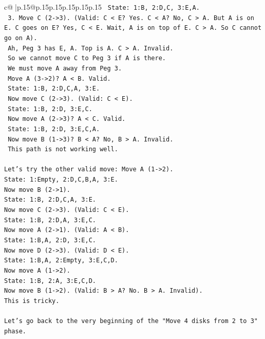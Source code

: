 \documentclass{article}
\begin{document}
{\begin{supertabular}{c@{$\;$}|p{.15\linewidth}@{}p{.15\linewidth}p{.15\linewidth}p{.15\linewidth}p{.15\linewidth}p{.15\linewidth}}
{{{\texttt{      State: 1:B, 2:D,C, 3:E,A.} \\
\texttt{   3. Move C (2{-}>3). (Valid: C < E? Yes. C < A? No, C > A. But A is on E. C goes on E? Yes, C < E. Wait, A is on top of E. C > A. So C cannot go on A).} \\
\texttt{      Ah, Peg 3 has E, A. Top is A. C > A. Invalid.} \\
\texttt{      So we cannot move C to Peg 3 if A is there.} \\
\texttt{      We must move A away from Peg 3.} \\
\texttt{      Move A (3{-}>2)? A < B. Valid.} \\
\texttt{      State: 1:B, 2:D,C,A, 3:E.} \\
\texttt{      Now move C (2{-}>3). (Valid: C < E).} \\
\texttt{      State: 1:B, 2:D, 3:E,C.} \\
\texttt{      Now move A (2{-}>3)? A < C. Valid.} \\
\texttt{      State: 1:B, 2:D, 3:E,C,A.} \\
\texttt{      Now move B (1{-}>3)? B < A? No, B > A. Invalid.} \\
\texttt{      This path is not working well.} \\
\\ 
\texttt{Let's try the other valid move: Move A (1{-}>2).} \\
\texttt{State: 1:Empty, 2:D,C,B,A, 3:E.} \\
\texttt{Now move B (2{-}>1).} \\
\texttt{State: 1:B, 2:D,C,A, 3:E.} \\
\texttt{Now move C (2{-}>3). (Valid: C < E).} \\
\texttt{State: 1:B, 2:D,A, 3:E,C.} \\
\texttt{Now move A (2{-}>1). (Valid: A < B).} \\
\texttt{State: 1:B,A, 2:D, 3:E,C.} \\
\texttt{Now move D (2{-}>3). (Valid: D < E).} \\
\texttt{State: 1:B,A, 2:Empty, 3:E,C,D.} \\
\texttt{Now move A (1{-}>2).} \\
\texttt{State: 1:B, 2:A, 3:E,C,D.} \\
\texttt{Now move B (1{-}>2). (Valid: B > A? No. B > A. Invalid).} \\
\texttt{This is tricky.} \\
\\ 
\texttt{Let's go back to the very beginning of the "Move 4 disks from 2 to 3" phase.} \\
}}}
\end{supertabular}}
\end{document}
